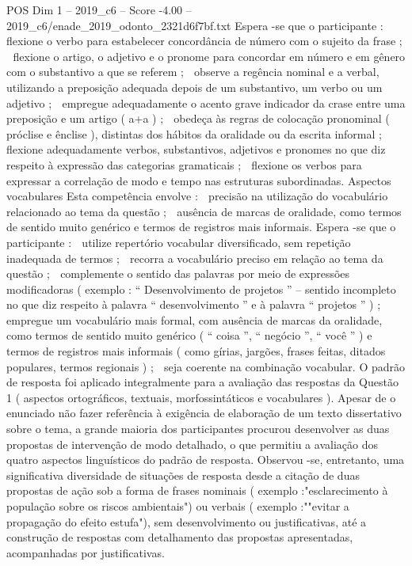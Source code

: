 \begin{textsample}{POS Dim 1 – 2019\_c6 – Score -4.00 – 2019\_c6/enade\_2019\_odonto\_2321d6f7bf.txt}
Espera -se que o participante :  flexione o verbo para estabelecer concordância de número com o sujeito da frase ;  flexione o artigo, o adjetivo e o pronome para concordar em número e em gênero com o substantivo a que se referem ;  observe a regência nominal e a verbal, utilizando a preposição adequada depois de um substantivo, um verbo ou um adjetivo ;  empregue adequadamente o acento grave indicador da crase entre uma preposição e um artigo ( a+a ) ;  obedeça às regras de colocação pronominal ( próclise e ênclise ), distintas dos hábitos da oralidade ou da escrita informal ;  flexione adequadamente verbos, substantivos, adjetivos e pronomes no que diz respeito à expressão das categorias gramaticais ;  flexione os verbos para expressar a correlação de modo e tempo nas estruturas subordinadas.
Aspectos vocabulares Esta competência envolve :  precisão na utilização do vocabulário relacionado ao tema da questão ;  ausência de marcas de oralidade, como termos de sentido muito genérico e termos de registros mais informais.
Espera -se que o participante :  utilize repertório vocabular diversificado, sem repetição inadequada de termos ;  recorra a vocabulário preciso em relação ao tema da questão ;  complemente o sentido das palavras por meio de expressões modificadoras ( exemplo : “ Desenvolvimento de projetos ” – sentido incompleto no que diz respeito à palavra “ desenvolvimento ” e à palavra “ projetos ” ) ;  empregue um vocabulário mais formal, com ausência de marcas da oralidade, como termos de sentido muito genérico ( “ coisa ”, “ negócio ”, “ você ” ) e termos de registros mais informais ( como gírias, jargões, frases feitas, ditados populares, termos regionais ) ;  seja coerente na combinação vocabular.
O padrão de resposta foi aplicado integralmente para a avaliação das respostas da Questão 1 ( aspectos ortográficos, textuais, morfossintáticos e vocabulares ).
Apesar de o enunciado não fazer referência à exigência de elaboração de um texto dissertativo sobre o tema, a grande maioria dos participantes procurou desenvolver as duas propostas de intervenção de modo detalhado, o que permitiu a avaliação dos quatro aspectos linguísticos do padrão de resposta.
Observou -se, entretanto, uma significativa diversidade de situações de resposta desde a citação de duas propostas de ação sob a forma de frases nominais ( exemplo :"esclarecimento à população sobre os riscos ambientais") ou verbais ( exemplo :""evitar a propagação do efeito estufa"), sem desenvolvimento ou justificativas, até a construção de respostas com detalhamento das propostas apresentadas, acompanhadas por justificativas.

\end{textsample}
